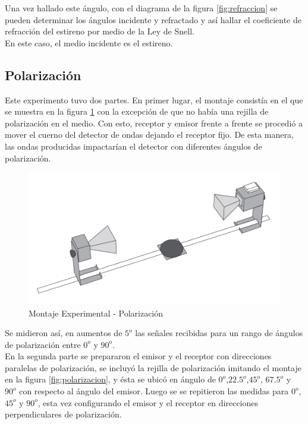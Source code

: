 \documentclass[%
 reprint,
 amsmath,amssymb,
 aps,
]{revtex4-1}
\begin{document}
Una vez hallado este ángulo, con el diagrama de la figura \ref{fig:refraccion} se pueden determinar los ángulos incidente y refractado y así hallar el coeficiente de refracción del estireno por medio de la Ley de Snell. \\

En este caso, el medio incidente es el estireno.\\
 
\subsection{\label{sec:level2}Polarización}

Este experimento tuvo dos partes. En primer lugar, el montaje consistía en el que se muestra en la figura \ref{fig:polarizador1} con la excepción de que no había una rejilla de polarización en el medio. Con esto, receptor y emisor frente a frente se procedió a mover el cuerno del detector de ondas dejando el receptor fijo. De esta manera, las ondas producidas impactarían el detector con diferentes ángulos de polarización. \\ 

\begin{figure}[h!]
\centering
\includegraphics[width=0.7\linewidth]{Pictures/polarizador1}
\caption{Montaje Experimental - Polarización}
\label{fig:polarizador1}
\end{figure}

Se midieron así, en aumentos de $5^o$ las señales recibidas para un rango de ángulos de polarización entre $0^o$ y $90^o$. \\

En la segunda parte se prepararon el emisor y el receptor con direcciones paralelas de polarización, se incluyó la rejilla de polarización imitando el montaje en la figura \ref{fig:polarizacion}, y ésta se ubicó en ángulo de $0^o$,$22.5^o$,$45^o$, $67.5^o$ y $90^o$ con respecto al ángulo del emisor. Luego se  se repitieron las medidas para $0^o$, $45^o$ y $90^o$, esta vez configurando el emisor y el receptor en direcciones perpendiculares de polarización.\\ 
\end{document}
